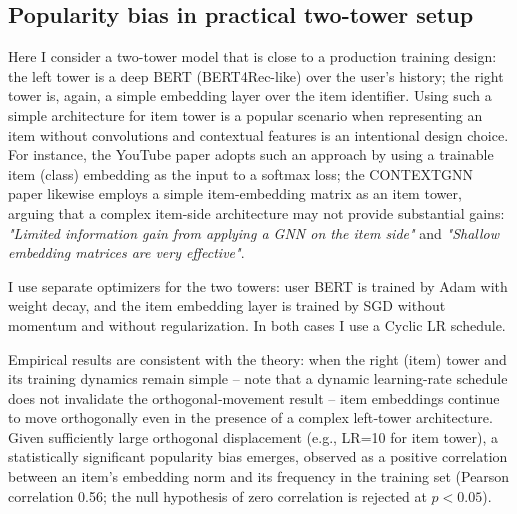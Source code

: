 \subsection{Popularity bias in practical two-tower setup}

Here I consider a two-tower model that is close to a production training design: the left tower is a deep BERT (BERT4Rec-like) over the user's history; the right tower is, again, a simple embedding layer over the item identifier. 
Using such a simple architecture for item tower is a popular scenario when representing an item without convolutions and contextual features is an intentional design choice. 
For instance, the YouTube paper adopts such an approach by using a trainable item (class) embedding as the input to a softmax loss; 
the CONTEXTGNN paper likewise employs a simple item-embedding matrix as an item tower, arguing that a complex item-side architecture may not provide substantial gains: \emph{"Limited information gain from applying a GNN on the item side"} and \emph{"Shallow embedding matrices are very effective"}.

I use separate optimizers for the two towers: user BERT is trained by Adam with weight decay, and the item embedding layer is trained by SGD without momentum and without regularization. 
In both cases I use a Cyclic LR schedule. 

Empirical results are consistent with the theory: when the right (item) tower and its training dynamics remain simple -- note that a dynamic learning-rate schedule does not invalidate the orthogonal‑movement result -- item embeddings continue to move orthogonally even in the presence of a complex left‑tower architecture.
Given sufficiently large orthogonal displacement (e.g., LR=10 for item tower), a statistically significant popularity bias emerges, observed as a positive correlation between an item’s embedding norm and its frequency in the training set (Pearson correlation 0.56; the null hypothesis of zero correlation is rejected at $p<0.05$).
